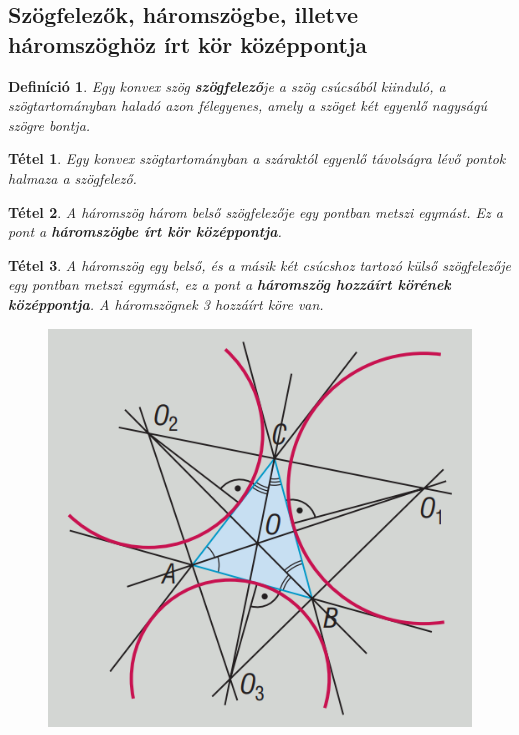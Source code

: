 \documentclass[12pt,a4paper]{article}
\newtheorem{theorem}{Tétel} [section]
\newtheorem{definition}{Definíció} [section]
\begin{document}
\subsection{Szögfelezők, háromszögbe, illetve háromszöghöz írt kör középpontja}

\begin{definition}
Egy konvex szög \textbf{szögfelező}je a szög csúcsából kiinduló, a szögtartományban haladó azon félegyenes, amely a szöget két egyenlő nagyságú szögre bontja.
\end{definition}

\begin{theorem}
Egy konvex szögtartományban a száraktól egyenlő távolságra lévő pontok halmaza a szögfelező.
\end{theorem}

\begin{theorem}
A háromszög három belső szögfelezője egy pontban metszi egymást. Ez a pont a \textbf{háromszögbe írt kör középpontja}.
\end{theorem}

\begin{theorem}
A háromszög egy belső, és a másik két csúcshoz tartozó külső szögfelezője egy pontban metszi egymást, ez a pont a \textbf{háromszög hozzáírt körének középpontja}. A háromszögnek 3 hozzáírt köre van.
\begin{figure}[h]
\centering
\includegraphics[scale=0.3]{geometry/hozzairt_kor}
\end{figure}

\end{theorem}
\end{document}
